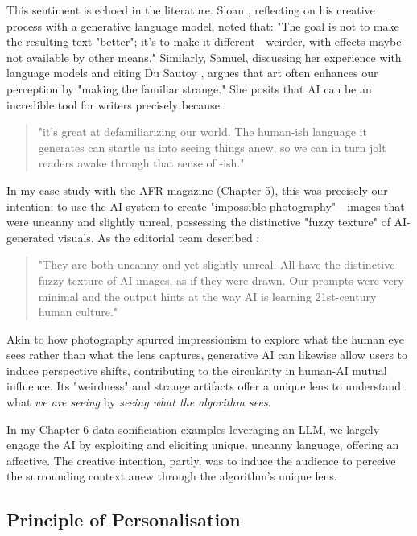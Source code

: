 This sentiment is echoed in the literature. Sloan \cite{Sloan2016-fj}, reflecting on his creative process with a generative language model, noted that: "The goal is not to make the resulting text "better"; it's to make it different—weirder, with effects maybe not available by other means." Similarly, Samuel, discussing her experience with language models and citing Du Sautoy \cite{Samuel2019-gc}, argues that art often enhances our perception by "making the familiar strange." She posits that AI can be an incredible tool for writers precisely because:

\begin{quote}
"it's great at defamiliarizing our world. The human-ish language it generates can startle us into seeing things anew, so we can in turn jolt readers awake through that sense of -ish."
\end{quote}

In my case study with the AFR magazine (Chapter 5), this was precisely our intention: to use the AI system to create "impossible photography"—images that were uncanny and slightly unreal, possessing the distinctive "fuzzy texture" of AI-generated visuals. As the editorial team described \cite{Drummond2023-av}:

\begin{quote}
"They are both uncanny and yet slightly unreal. All have the distinctive fuzzy texture of AI images, as if they were drawn. Our prompts were very minimal and the output hints at the way AI is learning 21st-century human culture."
\end{quote}

Akin to how photography spurred impressionism to explore what the human eye sees rather than what the lens captures, generative AI can likewise allow users to induce perspective shifts, contributing to the circularity in human-AI mutual influence. Its "weirdness" and strange artifacts offer a unique lens to understand what \textit{we are seeing} by \textit{seeing what the algorithm sees}. 

In my Chapter 6 data sonificiation examples leveraging an LLM, we largely engage the AI by exploiting and eliciting unique, uncanny language, offering an affective. The creative intention, partly, was to induce the audience to perceive the surrounding context anew through the algorithm's unique lens.

\subsection{Principle of Personalisation}

